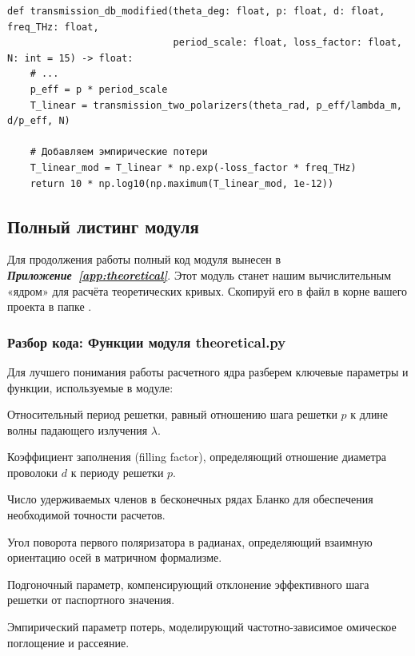 \begin{verbatim}
def transmission_db_modified(theta_deg: float, p: float, d: float, freq_THz: float, 
                             period_scale: float, loss_factor: float, N: int = 15) -> float:
    # ...
    p_eff = p * period_scale
    T_linear = transmission_two_polarizers(theta_rad, p_eff/lambda_m, d/p_eff, N)
    
    # Добавляем эмпирические потери
    T_linear_mod = T_linear * np.exp(-loss_factor * freq_THz)
    return 10 * np.log10(np.maximum(T_linear_mod, 1e-12))
\end{verbatim}

\subsection{Полный листинг модуля}

Для продолжения работы полный код модуля  вынесен в \textbf{\textit{Приложение~\ref{app:theoretical}}}. Этот модуль станет нашим вычислительным «ядром» для расчёта теоретических кривых. Скопируй его в файл  в корне вашего проекта в папке .

\subsubsection{Разбор кода: Функции модуля theoretical.py}

Для лучшего понимания работы расчетного ядра разберем ключевые параметры и функции, используемые в модуле:

\begin{syntaxdesc}
    \item[Параметр функции \mycode{p_over_lambda: float}] Относительный период решетки, равный отношению шага решетки $p$ к длине волны падающего излучения $\lambda$.
    \item[Параметр функции \mycode{d_over_p: float}] Коэффициент заполнения (filling factor), определяющий отношение диаметра проволоки $d$ к периоду решетки $p$.
    \item[Количество гармоник \mycode{N: int = 15}] Число удерживаемых членов в бесконечных рядах Бланко для обеспечения необходимой точности расчетов.
    \item[Угол поворота \mycode{theta: float}] Угол поворота первого поляризатора в радианах, определяющий взаимную ориентацию осей в матричном формализме.
    \item[Масштаб периода \mycode{period_scale: float}] Подгоночный параметр, компенсирующий отклонение эффективного шага решетки от паспортного значения.
    \item[Коэффициент затухания \mycode{loss_factor: float}] Эмпирический параметр потерь, моделирующий частотно-зависимое омическое поглощение и рассеяние.
\end{syntaxdesc}

